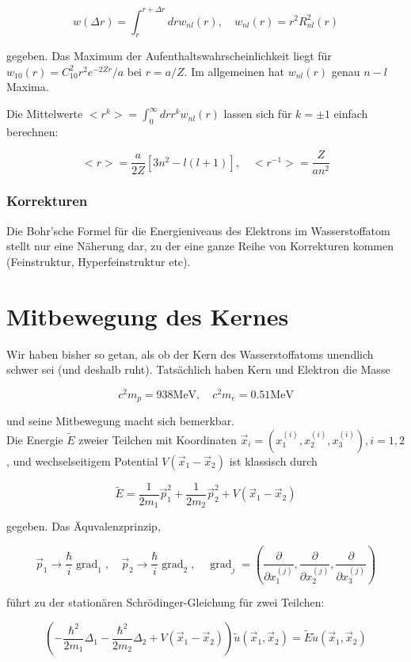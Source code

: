 \documentclass[10pt, letterpaper]{article}
\begin{document}
$$
w(\Delta r)=\int_{r}^{r+\Delta r} d r w_{n l}(r), \quad w_{n l}(r)=r^{2} R_{n l}^{2}(r)
$$

gegeben. Das Maximum der Aufenthaltswahrscheinlichkeit liegt für $w_{10}(r)=C_{10}^{2} r^{2} e^{-2 Z r} / a$ bei $r=a / Z$. Im allgemeinen hat $w_{n l}(r)$ genau $n-l$ Maxima.

Die Mittelwerte $<r^{k}>=\int_{0}^{\infty} d r r^{k} w_{n l}(r)$ lassen sich für $k= \pm 1$ einfach berechnen:

$$
<r>=\frac{a}{2 Z}\left[3 n^{2}-l(l+1)\right], \quad<r^{-1}>=\frac{Z}{a n^{2}}
$$

\subsubsection*{Korrekturen}
Die Bohr'sche Formel für die Energieniveaus des Elektrons im Wasserstoffatom stellt nur eine Näherung dar, zu der eine ganze Reihe von Korrekturen kommen (Feinstruktur, Hyperfeinstruktur etc).

\section*{Mitbewegung des Kernes}
Wir haben bisher so getan, als ob der Kern des Wasserstoffatoms unendlich schwer sei (und deshalb ruht). Tatsächlich haben Kern und Elektron die Masse

$$
c^{2} m_{p}=938 \mathrm{MeV}, \quad c^{2} m_{e}=0.51 \mathrm{MeV}
$$

und seine Mitbewegung macht sich bemerkbar.\\
Die Energie $\tilde{E}$ zweier Teilchen mit Koordinaten $\vec{x}_{i}=\left(x_{1}^{(i)}, x_{2}^{(i)}, x_{3}^{(i)}\right), i=1,2$, und wechselseitigem Potential $V\left(\vec{x}_{1}-\vec{x}_{2}\right)$ ist klassisch durch

$$
\tilde{E}=\frac{1}{2 m_{1}} \vec{p}_{1}^{2}+\frac{1}{2 m_{2}} \vec{p}_{2}^{2}+V\left(\vec{x}_{1}-\vec{x}_{2}\right)
$$

gegeben. Das Äquvalenzprinzip,

$$
\vec{p}_{1} \rightarrow \frac{\hbar}{i} \operatorname{grad}_{1}, \quad \vec{p}_{2} \rightarrow \frac{\hbar}{i} \operatorname{grad}_{2}, \quad \operatorname{grad}_{j}=\left(\frac{\partial}{\partial x_{1}^{(j)}}, \frac{\partial}{\partial x_{2}^{(j)}}, \frac{\partial}{\partial x_{3}^{(j)}}\right)
$$

führt zu der stationären Schrödinger-Gleichung für zwei Teilchen:

$$
\left(-\frac{\hbar^{2}}{2 m_{1}} \Delta_{1}-\frac{\hbar^{2}}{2 m_{2}} \Delta_{2}+V\left(\vec{x}_{1}-\vec{x}_{2}\right)\right) \tilde{u}\left(\vec{x}_{1}, \vec{x}_{2}\right)=\tilde{E} \tilde{u}\left(\vec{x}_{1}, \vec{x}_{2}\right)
$$
\end{document}
